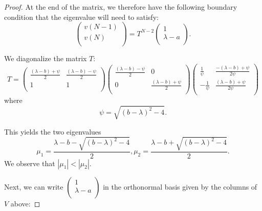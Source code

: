 \documentclass{article}
\numberwithin{equation}{section}
\numberwithin{theorem}{section}
\numberwithin{proposition}{section}
\numberwithin{lemma}{section}
\numberwithin{corollary}{section}
\numberwithin{definition}{section}
\begin{document}
\begin{proof}
At the end of the matrix, we therefore have the following boundary condition that the eigenvalue will need to satisfy:
\begin{equation}
	\label{transfermatrixboundarycondition}
	\left(
	\begin{array}{c}
		v(N-1) \\
		v(N) \\
	\end{array}
	\right)
	=
	T^{N-2}
	\left(
	\begin{array}{c}
		1 \\
		\lambda - a \\
	\end{array}
	\right).
\end{equation}

We diagonalize the matrix $T$:
\begin{equation*}
	T = 
	\left(
	\begin{array}{cc}
		\frac{(\lambda-b) + \psi}{2} & \frac{(\lambda-b) - \psi}{2} \\
		1 & 1 \\
	\end{array}
	\right)
	\left(
	\begin{array}{cc}
		\frac{(\lambda - b) - \psi}{2} & 0 \\
		0 & \frac{(\lambda - b) + \psi}{2} \\
	\end{array}
	\right)
	\left(
	\begin{array}{cc}
		\frac{1}{\psi} & \frac{-(\lambda-b) + \psi}{2\psi} \\
		-\frac{1}{\psi} & \frac{(\lambda-b) + \psi}{2\psi} \\	
	\end{array}
	\right)
\end{equation*}
	where
\begin{equation*}
	\psi = \sqrt{(b-\lambda)^2  -4}.
\end{equation*}

This yields the two eigenvalues
\begin{equation}
	\mu_1 = \frac{\lambda - b - \sqrt{(b-\lambda)^2  -4}}{2}, \mu_2 = \frac{\lambda - b + \sqrt{(b-\lambda)^2  -4}}{2}.
\end{equation}
We observe that $|\mu_1| < |\mu_2|$.

Next, we can write $ \left(
\begin{array}{c}
	1 \\
	\lambda - a \\
\end{array}
\right)
$ in the orthonormal basis given by the columns of $V$ above:


\end{proof}
\end{document}

